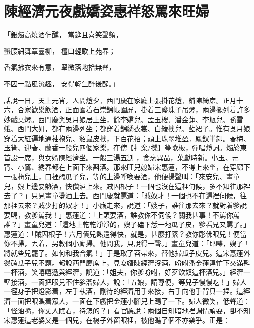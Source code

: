 %

\chapter{陳經濟元夜戲嬌姿\KG 惠祥怒罵來旺婦}


\begin{showcontents}{}



「銀燭高燒酒乍醺，  當筵且喜笑聲頻，

蠻腰細舞章臺柳，  檀口輕歌上苑春；

香氣拂衣來有意，  翠微落地拾無聲，

不因一點風流趣，  安得韓生醉後醒。」

話說一日，天上元宵，人間燈夕，西門慶在家廳上張掛花燈，鋪陳綺席。正月十六，合家歡樂飲酒，正面圍着石崇錦帳圍屏，掛着三盞珠子吊燈，兩邊擺列着許多妙戲桌燈。西門慶與吳月娘居上坐，餘李嬌兒、孟玉樓、潘金蓮、李瓶兒、孫雪蛾、西門大姐，都在兩邊列坐；都穿着錦綉衣裳、白綾襖兒、藍裙子。惟有吳月娘穿着大紅遍地通袖袍兒、貂鼠皮襖，下百花袑；頭上珠翠堆盈，鳳釵半卸。春梅、玉筲、迎春、蘭香一般兒四個家樂，在傍【扌栾/擽】箏歌板，彈唱燈詞。燭於東首設一席，與女婿陳經濟坐。一般三湯五割 ，食烹異品，菓獻時新。小玉、元宵、小鵉、綉春都在上面下來斟酒。那來旺兒媳婦宋惠蓮，不得上來坐，在穿廊下一張椅兒上，口裡磕瓜子兒，等的上邊呼喚要酒，他便揚聲叫：「來安兒、畫童兒，娘上邊要熱酒，快儹酒上來。賊囚根子！一個也沒在這裡伺候，多不知往那裡去了？」只見畫童盪酒上去。西門慶就罵道：「賊奴才！一個也不在這裡伺候，往那裡去來？賊少打的奴才！」小廝走來，說道：「嫂子，誰往那去來？就對着爹說要喝，教爹罵我！」惠蓮道：「上頭要酒，誰教你不伺候？關我甚事！不罵你罵誰？」畫童兒道：「這地上乾乾淨淨的，嫂子磕下恁一地瓜子皮，爹看見又罵了。」惠蓮道：「賊囚根子！六月債兒熱還得快，就是，甚麼打緊？教你彫佛眼兒！便當你不掃，丟着，另教個小廝掃。他問我，只說得一聲。」畫童兒道：「耶嚛，嫂子！將就些兒罷了。如何和我合氣！」于是取了苕帚來，替他掃瓜子皮兒。這宋惠蓮外邊磕瓜子兒不題。都說西門慶席上，見女婿陳經濟沒酒，吩咐潘金蓮連忙下來滿斟一杯酒，笑嘻嘻遞與經濟，說道：「姐夫，你爹吩咐，好歹飲奴這杯酒兒。」經濟一壁接酒，一面把眼兒不住斜溜婦人，說：「五娘，請尊便，等兒子慢慢吃！」婦人一徑身子把燈影着，左手執酒，剛待的經濟用手來接，右手向他手背只一捏。這經濟一面把眼瞧着眾人，一面在下戲把金蓮小腳兒上踢了一下。婦人微笑，低聲道：「怪油嘴，你丈人瞧着，待怎的？」看官聽說：兩個自知暗地裡調情頑耍，卻不知宋惠蓮這老婆又是一個兒，在槅子外窗眼裡，被他瞧了個不亦樂乎。正是：


\end{showcontents}
